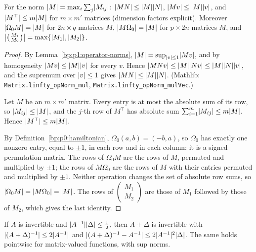 \begin{lemma}\label{bp:p1:matrix-norms}
For the norm $\lvert M\rvert=\max_i\sum_j\lvert M_{ij}\rvert$: $\lvert MN\rvert\le\lvert M\rvert\lvert N\rvert$, $\lvert Mv\rvert\le\lvert M\rvert\lvert v\rvert$, and
$\lvert M^\top\rvert\le m\lvert M\rvert$ for $m\times m'$ matrices (dimension factors explicit). Moreover
$\lvert \Omega_0M\rvert=\lvert M\rvert$ for $2n\times q$ matrices $M$, $\lvert M\Omega_0\rvert=\lvert M\rvert$ for $p\times2n$ matrices
$M$, and $\bigl|\left(\begin{smallmatrix}M_1\\M_2\end{smallmatrix}\right)\bigr|=\max\{\lvert M_1\rvert,\lvert M_2\rvert\}$.
\end{lemma}

\begin{proof}
\label{step:p1:mn-products}
By Lemma~\ref{bp:p1:operator-norms}, $\lvert M\rvert=\sup_{\lvert v\rvert\le1}\lvert Mv\rvert$, and by homogeneity
$\lvert Mv\rvert\le\lvert M\rvert\lvert v\rvert$ for every $v$. Hence $\lvert MNv\rvert\le\lvert M\rvert\lvert Nv\rvert\le\lvert M\rvert\lvert N\rvert\lvert v\rvert$, and the
supremum over $\lvert v\rvert\le1$ gives $\lvert MN\rvert\le\lvert M\rvert\lvert N\rvert$. (Mathlib:
\nolinkurl{Matrix.linfty_opNorm_mul}, \nolinkurl{Matrix.linfty_opNorm_mulVec}.)

\label{step:p1:mn-transpose}
Let $M$ be an $m\times m'$ matrix. Every entry is at most the absolute sum of its row, so
$\lvert M_{ij}\rvert\le\lvert M\rvert$, and the $j$-th row of $M^\top$ has absolute sum
$\sum_{i=1}^m\lvert M_{ij}\rvert\le m\lvert M\rvert$. Hence $\lvert M^\top\rvert\le m\lvert M\rvert$.

\label{step:p1:mn-signed}
By Definition~\ref{bp:p0:hamiltonian}, $\Omega_0(a,b)=(-b,a)$, so $\Omega_0$ has exactly one nonzero
entry, equal to $\pm1$, in each row and in each column: it is a signed permutation matrix. The rows of
$\Omega_0M$ are the rows of $M$, permuted and multiplied by $\pm1$; the rows of $M\Omega_0$ are the rows of
$M$ with their entries permuted and multiplied by $\pm1$. Neither operation changes the set of absolute
row sums, so $\lvert \Omega_0M\rvert=\lvert M\Omega_0\rvert=\lvert M\rvert$. The rows of
$\left(\begin{smallmatrix}M_1\\M_2\end{smallmatrix}\right)$ are those of $M_1$ followed by those of $M_2$,
which gives the last identity.
\end{proof}

\begin{lemma}\label{bp:p1:neumann}
If $A$ is invertible and $\lvert A^{-1}\rvert\lvert \Delta\rvert\le\frac12$, then $A+\Delta$ is invertible with
$\lvert (A+\Delta)^{-1}\rvert\le2\lvert A^{-1}\rvert$ and $\lvert (A+\Delta)^{-1}-A^{-1}\rvert\le2\lvert A^{-1}\rvert^2\lvert \Delta\rvert$.
The same holds pointwise for matrix-valued functions, with sup norms.
\end{lemma}

